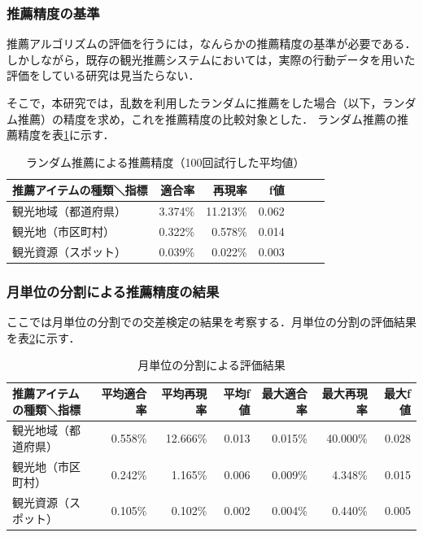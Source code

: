 \documentclass{jsarticle}
\begin{document}
\subsubsection{推薦精度の基準}

推薦アルゴリズムの評価を行うには，なんらかの推薦精度の基準が必要である．しかしながら，既存の観光推薦システムにおいては，実際の行動データを用いた評価をしている研究は見当たらない．

そこで，本研究では，乱数を利用したランダムに推薦をした場合（以下，ランダム推薦）の精度を求め，これを推薦精度の比較対象とした．
ランダム推薦の推薦精度を表\ref{result_random}に示す．

\begin{table}[ht!]
\small
\caption{ランダム推薦による推薦精度（100回試行した平均値）}
\begin{center}
\begin{tabular}{lrrrrrr}
\label{result_random}
推薦アイテムの種類＼指標    & 適合率 & 再現率 & f値 \\ \hline
観光地域（都道府県）        & 3.374\% & 11.213\% & 0.062 \\
観光地（市区町村）          & 0.322\% &  0.578\% & 0.014 \\
観光資源（スポット）        & 0.039\% &  0.022\% & 0.003 \\
\end{tabular}
\end{center}
\end{table}

\subsubsection{月単位の分割による推薦精度の結果}

ここでは月単位の分割での交差検定の結果を考察する．月単位の分割の評価結果を表\ref{result_monthly}に示す．

\begin{table}[!h]
\small
\caption{月単位の分割による評価結果}
\begin{center}
\begin{tabular}{lrrrrrr}
\label{result_monthly}
推薦アイテムの種類＼指標            & 平均適合率 & 平均再現率 & 平均f値 & 最大適合率 & 最大再現率 & 最大f値 \\ \hline
観光地域（都道府県）    & 0.558\% & 12.666\% & 0.013 & 0.015\% & 40.000\% & 0.028 \\
観光地（市区町村）      & 0.242\% &  1.165\% & 0.006 & 0.009\% &  4.348\% & 0.015 \\
観光資源（スポット）    & 0.105\% &  0.102\% & 0.002 & 0.004\% &  0.440\% & 0.005 \\
\end{tabular}
\end{center}
\end{table}
\end{document}
